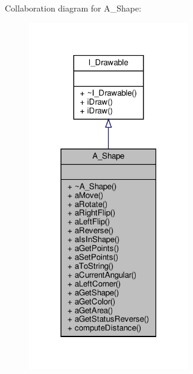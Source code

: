 Collaboration diagram for A\+\_\+\+Shape\+:
\nopagebreak
\begin{figure}[H]
\begin{center}
\leavevmode
\includegraphics[width=198pt]{classA__Shape__coll__graph}
\end{center}
\end{figure}
